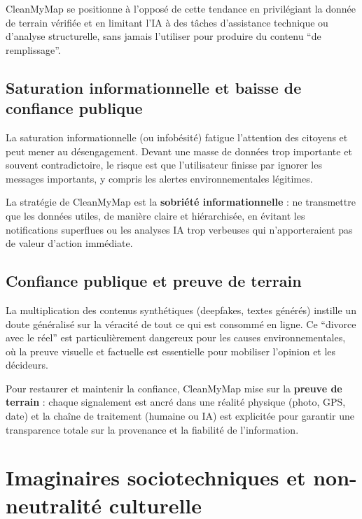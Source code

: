 \documentclass[
  10pt,
  a4paper,
  DIV=11,
  numbers=noendperiod,
  oneside]{scrreprt}
\let\oldtextbf\textbf
\renewcommand{\textbf}[1]{\oldtextbf{\textcolor{cmmnavy}{#1}}}
\begin{document}
CleanMyMap se positionne à l'opposé de cette tendance en privilégiant la
donnée de terrain vérifiée et en limitant l'IA à des tâches d'assistance
technique ou d'analyse structurelle, sans jamais l'utiliser pour
produire du contenu ``de remplissage''.

\subsection{Saturation informationnelle et baisse de confiance
publique}\label{saturation-informationnelle-et-baisse-de-confiance-publique}

La saturation informationnelle (ou infobésité) fatigue l'attention des
citoyens et peut mener au désengagement. Devant une masse de données
trop importante et souvent contradictoire, le risque est que
l'utilisateur finisse par ignorer les messages importants, y compris les
alertes environnementales légitimes.

La stratégie de CleanMyMap est la \textbf{sobriété informationnelle} :
ne transmettre que les données utiles, de manière claire et
hiérarchisée, en évitant les notifications superflues ou les analyses IA
trop verbeuses qui n'apporteraient pas de valeur d'action immédiate.

\subsection{Confiance publique et preuve de
terrain}\label{confiance-publique-et-preuve-de-terrain}

La multiplication des contenus synthétiques (deepfakes, textes générés)
instille un doute généralisé sur la véracité de tout ce qui est consommé
en ligne. Ce ``divorce avec le réel'' est particulièrement dangereux
pour les causes environnementales, où la preuve visuelle et factuelle
est essentielle pour mobiliser l'opinion et les décideurs.

Pour restaurer et maintenir la confiance, CleanMyMap mise sur la
\textbf{preuve de terrain} : chaque signalement est ancré dans une
réalité physique (photo, GPS, date) et la chaîne de traitement (humaine
ou IA) est explicitée pour garantir une transparence totale sur la
provenance et la fiabilité de l'information.

\section{Imaginaires sociotechniques et non-neutralité
culturelle}\label{imaginaires-sociotechniques-et-non-neutralituxe9-culturelle}
\end{document}
